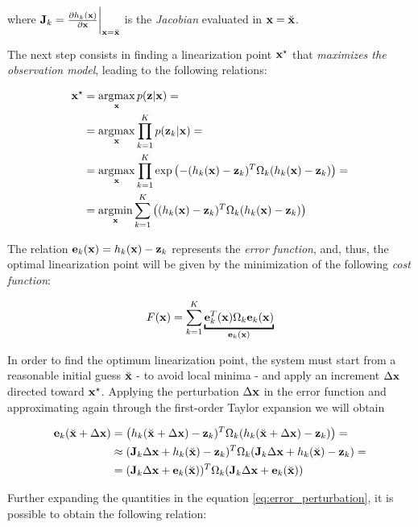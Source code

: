 \noindent where $\mathbf{J}_k = \frac{\partial h_k(\mathbf{x})}{\partial \mathbf{x}} \bigg\rvert_{\mathbf{x} = \breve{\mathbf{x}}}$ is the \textit{Jacobian} evaluated in $\mathbf{x} = \breve{\mathbf{x}}$.

The next step consists in finding a linearization point $\mathbf{x}^\star$ that \textit{maximizes the observation model}, leading to the following relations:

\begin{align*}
    \mathbf{x}^\star 	&= \operatorname*{argmax}_{\mathbf{x}} p(\mathbf{z} | \mathbf{x}) =\\
                &= \operatorname*{argmax}_{\mathbf{x}} \prod_{k = 1}^{K}p(\mathbf{z}_k | \mathbf{x}) =\\
                &= \operatorname*{argmax}_{\mathbf{x}} \prod_{k = 1}^{K}\exp\left(-(h_k(\mathbf{x}) - \mathbf{z}_k)^T\Omega_k(h_k(\mathbf{x}) - \mathbf{z}_k)\right) =\\
                &= \operatorname*{argmin}_{\mathbf{x}} \sum_{k = 1}^{K} \left((h_k(\mathbf{x}) - \mathbf{z}_k)^T\Omega_k(h_k(\mathbf{x}) - \mathbf{z}_k)\right)
\end{align*}

\noindent The relation $\mathbf{e}_k(\mathbf{x}) = h_k(\mathbf{x}) - \mathbf{z}_k$ represents the \textit{error function}, and, thus, the optimal linearization point will be given by the minimization of the following \textit{cost function}:

\begin{equation}
    F(\state) = \sum_{k = 1}^ {K} \underbracket{\error_k^T(\state)\Omega_k\error_k(\state)}_{\error_k(\state)}
    \label{eq:cost_function}
\end{equation}

\noindent In order to find the optimum linearization point, the system must start from a reasonable initial guess $\breve{\mathbf{x}}$ - to avoid local minima - and apply an increment $\Delta \mathbf{x}$ directed toward $\mathbf{x}^\star$. Applying the perturbation $\Delta \mathbf{x}$ in the error function and approximating again through the first-order Taylor expansion we will obtain 

\begin{align}
    \mathbf{e}_k(\breve{\mathbf{x}} + \Delta \mathbf{x}) &= \left(h_k(\breve{\mathbf{x}} + \Delta \mathbf{x}) - \mathbf{z}_k)^T \Omega_k (h_k(\breve{\mathbf{x}} + \Delta \mathbf{x}) - \mathbf{z}_k)\right) =\nonumber\\
    &\approx (\mathbf{J}_k\Delta \mathbf{x} + h_k(\breve{\mathbf{x}}) - \mathbf{z}_k)^T \Omega_k (\mathbf{J}_k\Delta \mathbf{x} + h_k(\breve{\mathbf{x}}) - \mathbf{z}_k) =\nonumber\\
    &= (\mathbf{J}_k\Delta \mathbf{x} + \mathbf{e}_k(\breve{\mathbf{x}}))^T \Omega_k (\mathbf{J}_k\Delta \mathbf{x} + \mathbf{e}_k(\breve{\mathbf{x}}))
    \label{eq:error_perturbation}
\end{align}

\noindent Further expanding the quantities in the equation \ref{eq:error_perturbation}, it is possible to obtain the following relation:

